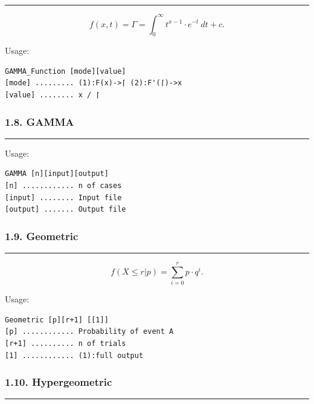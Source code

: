 \documentclass[
]{article}
\begin{document}
\begin{center}\rule{0.5\linewidth}{0.5pt}\end{center}

\[f(x,t) = \Gamma = \int_{0}^{\infty}t^{x - 1} \cdot e^{- t}\ dt + c.\]

Usage:

\begin{verbatim}
GAMMA_Function [mode][value]
[mode] ......... (1):F(x)->⌈ (2):F'(⌈)->x
[value] ........ x / ⌈
\end{verbatim}

\hypertarget{gamma}{%
\subsubsection{1.8. GAMMA}\label{gamma}}

\begin{center}\rule{0.5\linewidth}{0.5pt}\end{center}

Usage:

\begin{verbatim}
GAMMA [n][input][output]
[n] ............ n of cases
[input] ........ Input file
[output] ....... Output file
\end{verbatim}

\hypertarget{geometric}{%
\subsubsection{1.9. Geometric}\label{geometric}}

\begin{center}\rule{0.5\linewidth}{0.5pt}\end{center}

\[f\left( X \leq r|p \right) = \sum_{i = 0}^{r}{p \cdot q^{i}}.\]

Usage:

\begin{verbatim}
Geometric [p][r+1] [[1]]
[p] ............ Probability of event A
[r+1] .......... n of trials
[1] ............ (1):full output
\end{verbatim}

\hypertarget{hypergeometric}{%
\subsubsection{1.10. Hypergeometric}\label{hypergeometric}}

\begin{center}\rule{0.5\linewidth}{0.5pt}\end{center}
\end{document}

